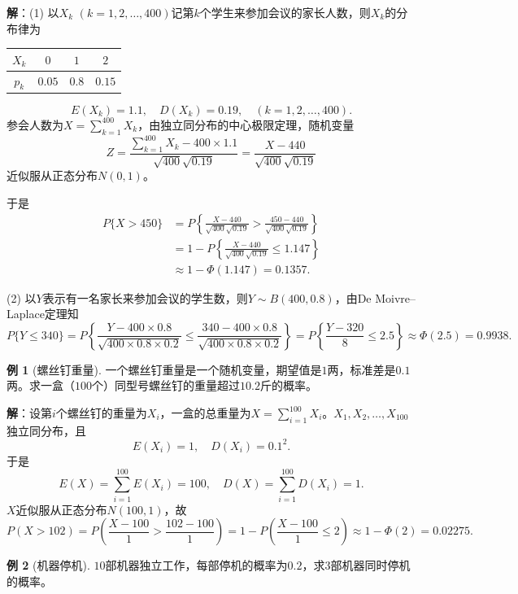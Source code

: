 \documentclass[11pt,a4paper]{report}
\theoremstyle{definition}
\newtheorem{example}{例}[chapter]
\begin{document}
\textbf{解}：(1) 以$X_{k}$ $(k=1,2,\ldots,400)$记第$k$个学生来参加会议的家长人数，则$X_{k}$的分布律为
\begin{table}[htbp]
\centering
\begin{tabular}{@{}cccc@{}}  
\toprule
$X_{k}$ & $0$ & $1$ & $2$ \\
\midrule
$p_{k}$ & $0.05$ & $0.8$ & $0.15$ \\
\bottomrule
\end{tabular}
\end{table}

\[
E(X_{k})=1.1,\quad D(X_{k})=0.19,\quad(k=1,2,\ldots,400).
\]
参会人数为$X=\sum_{k=1}^{400}X_{k}$，由独立同分布的中心极限定理，随机变量
\[
Z=\frac{\sum_{k=1}^{400}X_{k}-400\times1.1}{\sqrt{400}\sqrt{0.19}}=\frac{X-440}{\sqrt{400}\sqrt{0.19}}
\]
近似服从正态分布$N(0,1)$。

于是
\begin{align*}
P\{X>450\}&=P\left\{\frac{X-440}{\sqrt{400}\sqrt{0.19}}>\frac{450-440}{\sqrt{400}\sqrt{0.19}}\right\}\\
&=1-P\left\{\frac{X-440}{\sqrt{400}\sqrt{0.19}}\leq1.147\right\}\\
&\approx1-\Phi(1.147)=0.1357.
\end{align*}

(2) 以$Y$表示有一名家长来参加会议的学生数，则$Y\sim B(400,0.8)$，由De Moivre--Laplace定理知
\[
P\{Y\leq340\}=P\left\{\frac{Y-400\times0.8}{\sqrt{400\times0.8\times0.2}}\leq\frac{340-400\times0.8}{\sqrt{400\times0.8\times0.2}}\right\}=P\left\{\frac{Y-320}{8}\leq2.5\right\}\approx\Phi(2.5)=0.9938.
\]

\begin{example}[螺丝钉重量]
一个螺丝钉重量是一个随机变量，期望值是$1$两，标准差是$0.1$两。求一盒（$100$个）同型号螺丝钉的重量超过$10.2$斤的概率。
\end{example}

\textbf{解}：设第$i$个螺丝钉的重量为$X_{i}$，一盒的总重量为$X=\sum_{i=1}^{100}X_{i}$。$X_{1},X_{2},\ldots,X_{100}$独立同分布，且
\[
E(X_{i})=1,\quad D(X_{i})=0.1^{2}.
\]
于是
\[
E(X)=\sum_{i=1}^{100}E(X_{i})=100,\quad D(X)=\sum_{i=1}^{100}D(X_{i})=1.
\]
$X$近似服从正态分布$N(100,1)$，故
\[
P(X>102)=P\left(\frac{X-100}{1}>\frac{102-100}{1}\right)=1-P\left(\frac{X-100}{1}\leq2\right)\approx1-\Phi(2)=0.02275.
\]

\begin{example}[机器停机]
$10$部机器独立工作，每部停机的概率为$0.2$，求$3$部机器同时停机的概率。
\end{example}
\end{document}

